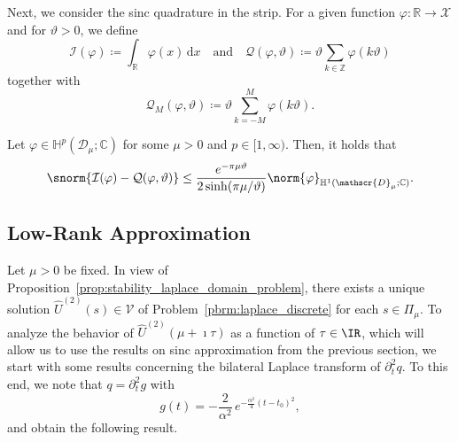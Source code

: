 Next, we consider the sinc quadrature in the strip.
For a given function $\varphi: \mathbb{R} \rightarrow \mathcal{X}$
and for $\vartheta>0$, we define
\begin{equation}\label{eq:def_I_T}
    \mathcal{I}(\varphi)
    \coloneqq
    \int_{\mathbb{R}}
    \varphi(x) \,\text{d}x
    \quad
    \text{and}
    \quad
    \mathcal{Q}(\varphi,\vartheta)
    \coloneqq
    \vartheta
    \sum_{k \in \mathbb{Z}} \varphi(k\vartheta)
\end{equation}
together with 
\begin{equation}
    \mathcal{Q}_M(\varphi,\vartheta)
    \coloneqq
    \vartheta
    \sum_{k=-M}^{M} \varphi(k\vartheta).
\end{equation}

\begin{proposition}
\label{prop:integral_sinc}
Let $\varphi \in \mathbb{H}^p(\mathscr{D}_\mu;\mathbb{C})$ for some $\mu>0$ and $p\in [1,\infty)$. 
Then, it holds that
\begin{equation}
	\snorm{
	       \mathcal{I}(\varphi)
           -
           \mathcal{Q}(\varphi,\vartheta)
	}
    \leq
    \frac{
        e^{-\pi \mu \vartheta}
    }{
        2\sinh(\pi \mu/\vartheta)
    }
    \norm{\varphi}_{\mathbb{H}^1(\mathscr{D}_\mu;\mathbb{C})}.
\end{equation}
\end{proposition}

\subsection{Low-Rank Approximation}\label{ssec:low_rank}
Let $\mu>0$ be fixed. In view of Proposition~\ref{prop:stability_laplace_domain_problem}, there exists a unique solution $\widehat{U}^{(2)}(s) \in \mathcal{V}$ of Problem~\ref{pbrm:laplace_discrete} for each $s\in\Pi_\mu$.
To analyze the behavior of $\widehat{U}^{(2)}(\mu+\imath\tau)$ as a function of $\tau\in\IR$, which will allow us to use the results on sinc approximation from the previous section, we start with some results concerning the bilateral Laplace transform of $\partial_t^2 q$.
To this end, we note that $q=\partial_t^2 g$ with
\begin{equation}\label{eq:gausian_minus}
    g(t) = -\frac{2}{\alpha^2}\, e^{-\frac{\alpha^2}{4}(t - t_0)^2},
\end{equation}
and obtain the following result. 

